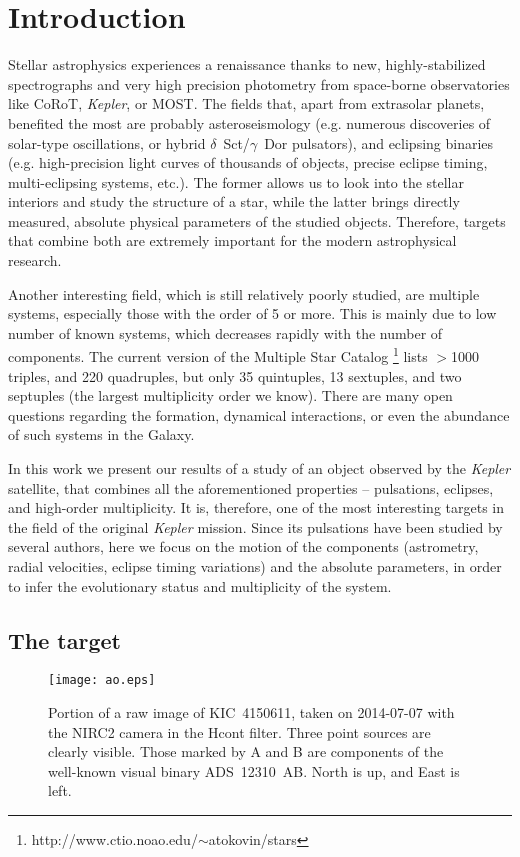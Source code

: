 \documentclass{aa}
\newcommand{\kep}{{\it Kepler }}
\begin{document}
\section{Introduction}
Stellar astrophysics experiences a renaissance thanks to new, highly-stabilized 
spectrographs and very high precision photometry from space-borne observatories 
like CoRoT, {\it Kepler}, or MOST. The fields that, apart from extrasolar planets,
benefited the most are probably asteroseismology (e.g. numerous discoveries of
solar-type oscillations, or hybrid $\delta$~Sct/$\gamma$~Dor pulsators), and 
eclipsing binaries (e.g. high-precision light curves of thousands of objects, 
precise eclipse timing, multi-eclipsing systems, etc.). The
former allows us to look into the stellar interiors and study the structure of
a star, while the latter brings directly measured, absolute physical parameters of the
studied objects.  Therefore, targets that combine both are extremely important for the
modern astrophysical research.

Another interesting field, which is still relatively poorly studied, are multiple 
systems, especially those with the order of 5 or more. This is mainly due to 
low number of known systems, which decreases rapidly with the number of components. 
The current version of the Multiple Star Catalog 
\citep[MSC;][]{tok97}\footnote{http://www.ctio.noao.edu/$\sim$atokovin/stars}
lists $>$1000 triples, and 220 quadruples, but only 35 quintuples,
13 sextuples, and two septuples (the largest multiplicity order we know). There are
many open questions regarding the formation, dynamical interactions, or even the
abundance of such systems in the Galaxy.

In this work we present our results of a study of an object observed by the \kep
satellite, that combines all the aforementioned properties -- pulsations, eclipses, 
and high-order multiplicity. It is, therefore, one of the most interesting targets
in the field of the original \kep mission.
Since its pulsations have been studied by several authors, here we focus on the 
motion of the components (astrometry, radial velocities, eclipse timing variations) 
and the absolute parameters, in order to infer the evolutionary status and multiplicity 
of the system.

\subsection{The target}

\begin{figure}
\centering
\texttt{[image: ao.eps]}
\caption{Portion of a raw image of KIC~4150611, taken on
2014-07-07 with the NIRC2 camera in the Hcont filter. 
Three point sources are clearly visible. Those marked by A and B
are components of the well-known visual binary
ADS~12310~AB. North is up, and East is left.}\label{fig_ao}
\end{figure}
\end{document}
